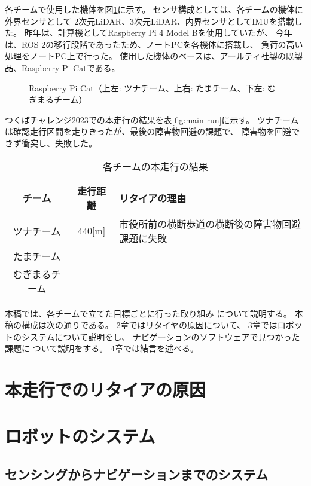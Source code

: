 \documentclass[twocolumn,9pt]{jsproceedings}
\begin{document}
各チームで使用した機体を図\ref{fig:raspicat}に示す。
センサ構成としては、各チームの機体に外界センサとして
2次元LiDAR、3次元LiDAR、内界センサとしてIMUを搭載した。
昨年は、計算機としてRaspberry Pi 4 Model Bを使用していたが、
今年は、ROS 2の移行段階であったため、ノートPCを各機体に搭載し、
負荷の高い処理をノートPC上で行った。
使用した機体のベースは、アールティ社製の既製品、Raspberry Pi Catである。

\begin{figure}[h]
 	\begin{center}
 		\caption{Raspberry Pi Cat（上左: ツナチーム、上右: たまチーム、下左: むぎまるチーム）}
 		\label{fig:raspicat}
 	\end{center}
\end{figure}

つくばチャレンジ2023での本走行の結果を表\ref{fig:main-run}に示す。
ツナチームは確認走行区間を走りきったが、最後の障害物回避の課題で、
障害物を回避できず衝突し、失敗した。

\begin{table}[h]
  \caption{各チームの本走行の結果}
  \label{MainRun}
	\begin{tabular}{|c|c|p{5.4cm}|}
    \hline
	チーム & 走行距離 & リタイアの理由 \\
    \hline
  ツナチーム & 440[m] & 市役所前の横断歩道の横断後の障害物回避課題に失敗\\
    \hline
  たまチーム &  & \\
    \hline
  むぎまるチーム &  & \\
    \hline
  \end{tabular}
\end{table}

本稿では、各チームで立てた目標ごとに行った取り組み
について説明する。
本稿の構成は次の通りである。 
2章ではリタイヤの原因について、
3章ではロボットのシステムについて説明をし、
ナビゲーションのソフトウェアで見つかった課題に
ついて説明をする。 
4章では結言を述べる。

\section{本走行でのリタイアの原因}

\section{ロボットのシステム}

\subsection{センシングからナビゲーションまでのシステム}\label{sub:localization}
\end{document}
